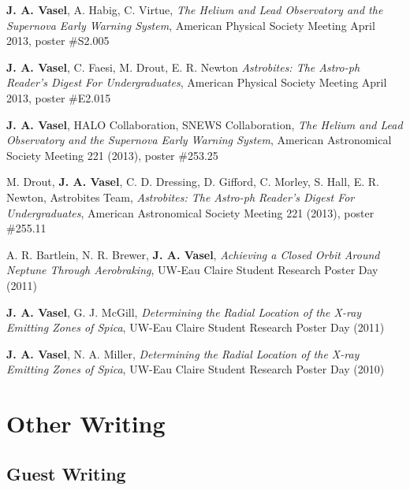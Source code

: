 \documentclass{cv}
\begin{document}
\begin{resume}
\textbf{J. A. Vasel}, A. Habig, C. Virtue, \emph{The Helium and Lead Observatory and the Supernova Early Warning System}, American Physical Society Meeting April 2013, poster \#S2.005

\textbf{J. A. Vasel}, C. Faesi, M. Drout, E. R. Newton \emph{Astrobites: The Astro-ph Reader's Digest For Undergraduates}, American Physical Society Meeting April 2013, poster \#E2.015

\textbf{J. A. Vasel}, HALO Collaboration, SNEWS Collaboration, \emph{The Helium and Lead Observatory and the Supernova Early Warning System}, American Astronomical Society Meeting 221 (2013), poster \#253.25

M. Drout, \textbf{J. A. Vasel}, C. D. Dressing, D. Gifford, C. Morley, S. Hall, E. R. Newton, Astrobites Team, \emph{Astrobites: The Astro-ph Reader's Digest For Undergraduates}, American Astronomical Society Meeting 221 (2013), poster \#255.11

A. R. Bartlein, N. R. Brewer, \textbf{J. A. Vasel}, \emph{Achieving a Closed Orbit Around Neptune Through Aerobraking}, UW-Eau Claire Student Research Poster Day (2011)

\textbf{J. A. Vasel}, G. J. McGill, \emph{Determining the Radial Location of the X-ray Emitting Zones of Spica}, UW-Eau Claire Student Research Poster Day (2011)

\textbf{J. A. Vasel}, N. A. Miller, \emph{Determining the Radial Location of the X-ray Emitting Zones of Spica}, UW-Eau Claire Student Research Poster Day (2010)



\section{Other Writing}

\vspace{-0.21in}
\subsection{\sc Guest Writing}



 \hfill \date{20 September 2014} \\
\itemSep

 \hfill \date{20 October 2012} \\
\itemSep


\end{resume}
\end{document}
